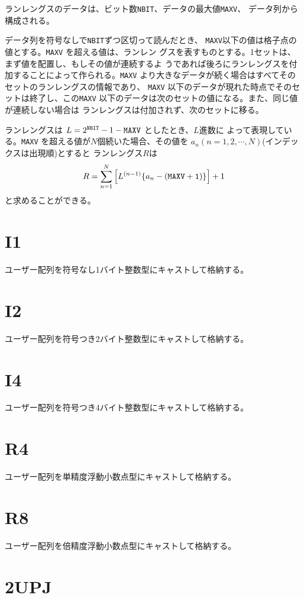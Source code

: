 ランレングスのデータは、ビット数{\tt NBIT}、データの最大値{\tt MAXV}、
データ列から構成される。

データ列を符号なしで{\tt NBIT}ずつ区切って読んだとき、
{\tt MAXV}以下の値は格子点の値とする。{\tt MAXV} を超える値は、ランレン
グスを表すものとする。1セットは、まず値を配置し、もしその値が連続するよ
うであれば後ろにランレングスを付加することによって作られる。{\tt MAXV}
より大きなデータが続く場合はすべてそのセットのランレングスの情報であり、
{\tt MAXV} 以下のデータが現れた時点でそのセットは終了し、この{\tt MAXV}
以下のデータは次のセットの値になる。また、同じ値が連続しない場合は
ランレングスは付加されず、次のセットに移る。

ランレングスは $L = 2^{\tt NBIT} - 1 - {\tt MAXV}$ としたとき、$L$進数に
よって表現している。{\tt MAXV} を超える値が$N$個続いた場合、その値を
$a_n(n = 1, 2, \cdots, N)$(インデックスは出現順)とすると
ランレングス$R$は
\begin{equation}
R=\sum_{n = 1}^{N}\left[L^{(n-1)}\{a_n- ({\tt MAXV + 1})\}\right] + 1
\end{equation}
と求めることができる。

\section{I1}
ユーザー配列を符号なし1バイト整数型にキャストして格納する。

\section{I2}
ユーザー配列を符号つき2バイト整数型にキャストして格納する。

\section{I4}
ユーザー配列を符号つき4バイト整数型にキャストして格納する。

\section{R4}
ユーザー配列を単精度浮動小数点型にキャストして格納する。

\section{R8}
ユーザー配列を倍精度浮動小数点型にキャストして格納する。

\section{2UPJ}

